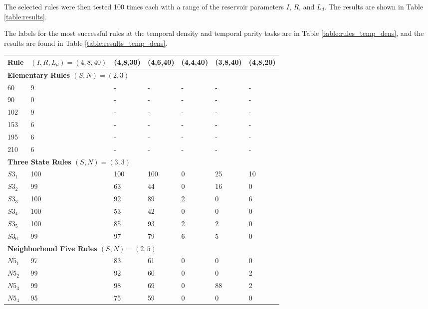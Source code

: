 \documentclass{elsarticle}
\begin{document}
\begin{multicols}{2}
The selected rules were then tested 100 times each with a range of the 
   reservoir parameters $I$, $R$, and $L_{d}$.  The results are shown in Table 
   \ref{table:results}. \par The labels for the most successful rules at the 
   temporal density and temporal parity tasks are in Table 
   \ref{table:rules_temp_dens}, and the results are found in Table 
   \ref{table:results_temp_dens}.



\begin{table}[!htbp] \centering
\small
\begin{tabular}{|l|l|l|l|l|l|l|}
\hline
\textbf{Rule} & \textbf{\boldmath$(I,R,L_{d})=(4,8,40)$} & \textbf{(4,8,30)} & 
\textbf{(4,6,40)} & \textbf{(4,4,40)} & \textbf{(3,8,40)} & \textbf{(4,8,20)} 
\\ \hline
\multicolumn{7}{|l|}{\textbf{Elementary Rules \boldmath$(S,N) = (2,3)$}} \\ 
\hline
60 & 9 & - & - & - & - & - \\ \hline
90 & 0 & - & - & - & - & - \\ \hline
102 & 9 & - & - & - & - & - \\ \hline
153 & 6 & - & - & - & - & - \\ \hline
195 & 6 & - & - & - & - & - \\ \hline
210 & 6 & - & - & - & - & - \\ \hline
\multicolumn{7}{|l|}{\textbf{Three State Rules \boldmath$(S,N) = (3,3)$}} \\ 
\hline
$S3_{1}$ & 100 & 100 & 100 & 0 & 25 & 10 \\ \hline
$S3_{2}$ & 99 & 63 & 44 & 0 & 16 & 0 \\ \hline
$S3_{3}$ & 100 & 92 & 89 & 2 & 0 & 6 \\ \hline
$S3_{4}$ & 100 & 53 & 42 & 0 & 0 & 0 \\ \hline
$S3_{5}$ & 100 & 85 & 93 & 2 & 2 & 0 \\ \hline
$S3_{6}$ & 99 & 97 & 79 & 6 & 5 & 0 \\ \hline
\multicolumn{7}{|l|}{\textbf{Neighborhood Five Rules \boldmath$(S,N) = (2,5)$}} 
\\ \hline
$N5_{1}$ & 97 & 83 & 61 & 0 & 0 & 0 \\ \hline
$N5_{2}$ & 99 & 92 & 60 & 0 & 0 & 2 \\ \hline
$N5_{3}$ & 99 & 98 & 69 & 0 & 88 & 2  \\ \hline
$N5_{4}$ & 95 & 75 & 59 & 0 & 0 & 0 \\ \hline

\end{tabular}
\end{table}
\end{multicols}
\end{document}
